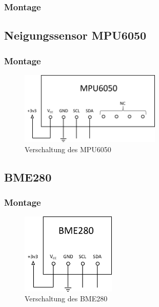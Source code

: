 

\subsubsection{Montage}




\subsection{Neigungssensor MPU6050}


\subsubsection{Montage}

\begin{figure}[H]
  \centering
  \includegraphics[width=0.6\textwidth]{./img/MPU6050_Plan.png}
  \caption{Verschaltung des MPU6050}\label{fig:MPU6050_Plan}
\end{figure}

\subsection{BME280}


\subsubsection{Montage}


\begin{figure}[H]
  \centering
  \includegraphics[width=0.4\textwidth]{./img/BME280_Plan.png}
  \caption{Verschaltung des BME280}\label{fig:BME280_Plan}
\end{figure}

